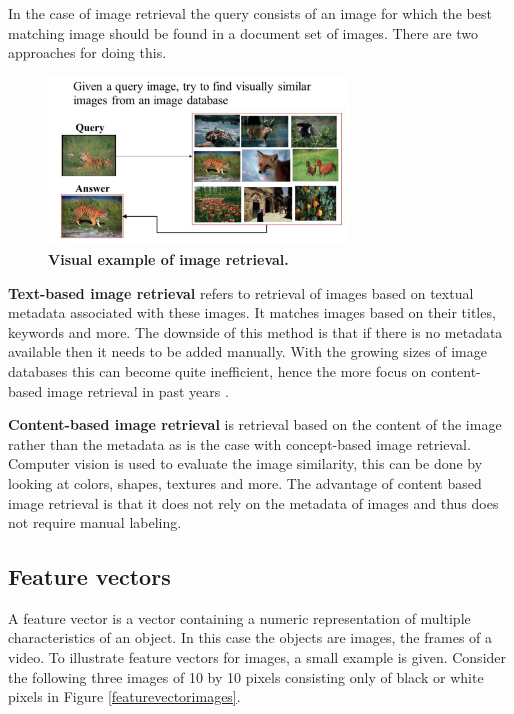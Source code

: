 \documentclass{article}
\begin{document}
In the case of image retrieval the query consists of an image for which the best matching image should be found in a document set of images. There are two approaches for doing this.

\begin{figure}[H]
	\includegraphics[width=8cm]{images/imageretrieval.png}
	\centering
	\caption{\textbf{Visual example of image retrieval.}}
	\label{fig:imageretrieval}
\end{figure}

\textbf{Text-based image retrieval} refers to retrieval of images based on textual metadata associated with these images. It matches images based on their titles, keywords and more. The downside of this method is that if there is no metadata available then it needs to be added manually. With the growing sizes of image databases this can become quite inefficient, hence the more focus on content-based image retrieval in past years \cite{rajam2013survey}.

\textbf{Content-based image retrieval} is retrieval based on the content of the image rather than the metadata as is the case with concept-based image retrieval. Computer vision is used to evaluate the image similarity, this can be done by looking at colors, shapes, textures and more. The advantage of content based image retrieval is that it does not rely on the metadata of images and thus does not require manual labeling.

\subsection{Feature vectors}
A feature vector is a vector containing a numeric representation of multiple characteristics of an object. In this case the objects are images, the frames of a video. To illustrate feature vectors for images, a small example is given. Consider the following three images of 10 by 10 pixels consisting only of black or white pixels in Figure \ref{featurevectorimages}.
\end{document}
